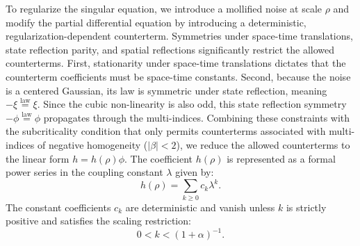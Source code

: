 To regularize the singular equation, we introduce a mollified noise at scale $\rho$ and modify the partial differential equation by introducing a deterministic, regularization-dependent counterterm. Symmetries under space-time translations, state reflection parity, and spatial reflections significantly restrict the allowed counterterms. First, stationarity under space-time translations dictates that the counterterm coefficients must be space-time constants. 
Second, because the noise is a centered Gaussian, its law is symmetric under state reflection, meaning $-\xi \stackrel{\text{law}}{=} \xi$. Since the cubic non-linearity is also odd, this state reflection symmetry $-\phi \stackrel{\text{law}}{=} \phi$ propagates through the multi-indices. 
Combining these constraints with the subcriticality condition that only permits counterterms associated with multi-indices of negative homogeneity ($|\beta| < 2$), we reduce the allowed counterterms to the linear form $h = h(\rho) \phi$. The coefficient $h(\rho)$ is represented as a formal power series in the coupling constant $\lambda$ given by:
\begin{equation}
h(\rho) = \sum_{k \geq 0} c_k \lambda^k.
\end{equation}
The constant coefficients $c_k$ are deterministic and vanish unless $k$ is strictly positive and satisfies the scaling restriction:
\begin{equation}
0 < k < (1 + \alpha)^{-1}.
\end{equation}

